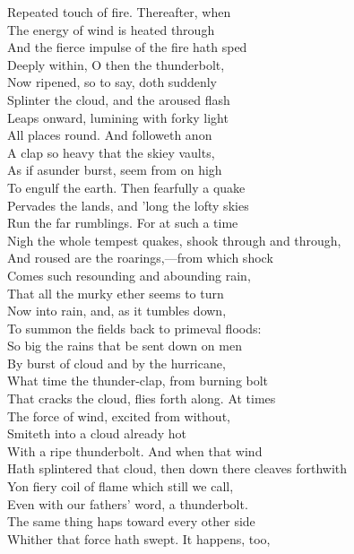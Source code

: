 Repeated touch of fire. Thereafter, when\\
The energy of wind is heated through\\
And the fierce impulse of the fire hath sped\\
Deeply within, O then the thunderbolt,\\
Now ripened, so to say, doth suddenly\\
Splinter the cloud, and the aroused flash\\
Leaps onward, lumining with forky light\\
All places round. And followeth anon\\
A clap so heavy that the skiey vaults,\\
As if asunder burst, seem from on high\\
To engulf the earth. Then fearfully a quake\\
Pervades the lands, and 'long the lofty skies\\
Run the far rumblings. For at such a time\\
Nigh the whole tempest quakes, shook through and through,\\
And roused are the roarings,—from which shock\\
Comes such resounding and abounding rain,\\
That all the murky ether seems to turn\\
Now into rain, and, as it tumbles down,\\
To summon the fields back to primeval floods:\\
So big the rains that be sent down on men\\
By burst of cloud and by the hurricane,\\
What time the thunder-clap, from burning bolt\\
That cracks the cloud, flies forth along. At times\\
The force of wind, excited from without,\\
Smiteth into a cloud already hot\\
With a ripe thunderbolt. And when that wind\\
Hath splintered that cloud, then down there cleaves forthwith\\
Yon fiery coil of flame which still we call,\\
Even with our fathers' word, a thunderbolt.\\
The same thing haps toward every other side\\
Whither that force hath swept. It happens, too,\\
